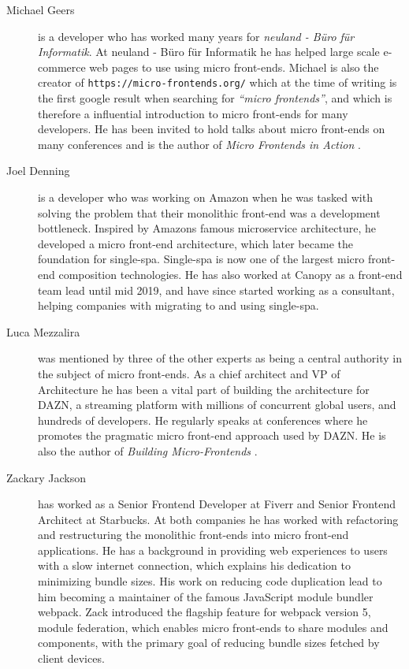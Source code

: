 \begin{description}
    \item[Michael Geers] is a developer who has worked many years for \textit{neuland - Büro für Informatik}. At neuland - Büro für Informatik he has helped large scale e-commerce web pages to use using micro front-ends. Michael is also the creator of \texttt{https://micro-frontends.org/} which at the time of writing is the first google result when searching for \textit{``micro frontends''}, and which is therefore a influential introduction to micro front-ends for many developers. He has been invited to hold talks about micro front-ends on many conferences and is the author of \textit{Micro Frontends in Action} \cite{Geers2020}.
    
    \item[Joel Denning] is a developer who was working on Amazon when he was tasked with solving the problem that their monolithic front-end was a development bottleneck. Inspired by Amazons famous microservice architecture, he developed a micro front-end architecture, which later became the foundation for single-spa. Single-spa is now one of the largest micro front-end composition technologies. He has also worked at Canopy as a front-end team lead until mid 2019, and have since started working as a consultant, helping companies with migrating to and using single-spa.
    
    \item[Luca Mezzalira] was mentioned by three of the other experts as being a central authority in the subject of micro front-ends. As a chief architect and VP of Architecture he has been a vital part of building the architecture for DAZN, a streaming platform with millions of concurrent global users, and hundreds of developers. He regularly speaks at conferences where he promotes the pragmatic micro front-end approach used by DAZN. He is also the author of \textit{Building Micro-Frontends} \cite{temp}.
    
    \item[Zackary Jackson] has worked as a Senior Frontend Developer at Fiverr and Senior Frontend Architect at Starbucks. At both companies he has worked with refactoring and restructuring the monolithic front-ends into micro front-end applications. He has a background in providing web experiences to users with a slow internet connection, which explains his dedication to minimizing bundle sizes. His work on reducing code duplication lead to him becoming a maintainer of the famous JavaScript module bundler webpack. Zack introduced the flagship feature for webpack version 5, module federation, which enables micro front-ends to share modules and components, with the primary goal of reducing bundle sizes fetched by client devices.
    

\end{description}
